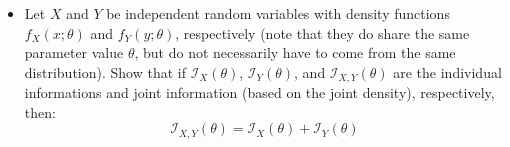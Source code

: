 \documentclass[10pt,twoside]{article}\usepackage[]{graphicx}\usepackage[dvipsnames,svgnames,table]{xcolor}
\begin{document}
\begin{enumerate}
\begin{itemize}
  \item Let $X$ and $Y$ be independent random variables with density functions $f_X(x; \theta)$ and $f_Y(y; \theta)$, respectively (note that they do share the same parameter value $\theta$, but do not necessarily have to come from the same distribution).
  Show that if $\mathcal{I}_X(\theta)$, $\mathcal{I}_Y(\theta)$, and $\mathcal{I}_{X, Y}(\theta)$ are the individual informations and joint information (based on the joint density), respectively, then:
  $$
  \mathcal{I}_{X, Y}(\theta) = \mathcal{I}_X(\theta) + \mathcal{I}_Y(\theta)
  $$
\end{itemize}

\end{enumerate}
\end{document}
